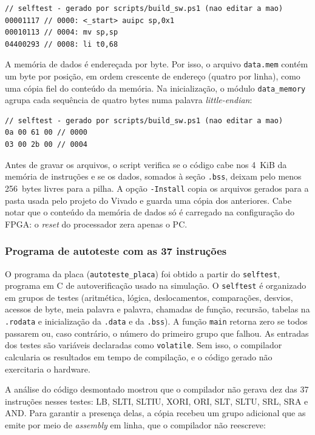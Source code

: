 \begin{lstlisting}
// selftest - gerado por scripts/build_sw.ps1 (nao editar a mao)
00001117 // 0000: <_start> auipc sp,0x1
00010113 // 0004: mv sp,sp
04400293 // 0008: li t0,68
\end{lstlisting}

A memória de dados é endereçada por byte. Por isso, o arquivo
\texttt{data.mem} contém um byte por posição, em ordem crescente de endereço
(quatro por linha), como uma cópia fiel do conteúdo da memória. Na
inicialização, o módulo \texttt{data\_memory} agrupa cada sequência de
quatro bytes numa palavra \textit{little-endian}:

\begin{lstlisting}
// selftest - gerado por scripts/build_sw.ps1 (nao editar a mao)
0a 00 61 00 // 0000
03 00 2b 00 // 0004
\end{lstlisting}

Antes de gravar os arquivos, o script verifica se o código cabe nos 4~KiB da
memória de instruções e se os dados, somados à seção \texttt{.bss}, deixam
pelo menos 256~bytes livres para a pilha. A opção \texttt{-Install} copia os
arquivos gerados para a pasta usada pelo projeto do Vivado e guarda uma
cópia dos anteriores. Cabe notar que o conteúdo da memória de dados só é
carregado na configuração do FPGA: o \textit{reset} do processador zera
apenas o PC.

\subsubsection{Programa de autoteste com as 37 instruções}

O programa da placa (\texttt{autoteste\_placa}) foi obtido a partir do
\texttt{selftest}, programa em C de autoverificação usado na simulação. O
\texttt{selftest} é organizado em grupos de testes (aritmética, lógica,
deslocamentos, comparações, desvios, acessos de byte, meia palavra e
palavra, chamadas de função, recursão, tabelas na \texttt{.rodata} e
inicialização da \texttt{.data} e da \texttt{.bss}). A função \texttt{main}
retorna zero se todos passarem ou, caso contrário, o número do primeiro
grupo que falhou. As entradas dos testes são variáveis declaradas como
\texttt{volatile}. Sem isso, o compilador calcularia os resultados em tempo
de compilação, e o código gerado não exercitaria o hardware.

A análise do código desmontado mostrou que o compilador não gerava dez das
37 instruções nesses testes: LB, SLTI, SLTIU, XORI, ORI, SLT, SLTU, SRL, SRA
e AND. Para garantir a presença delas, a cópia recebeu um grupo adicional
que as emite por meio de \textit{assembly} em linha, que o compilador não
reescreve:

